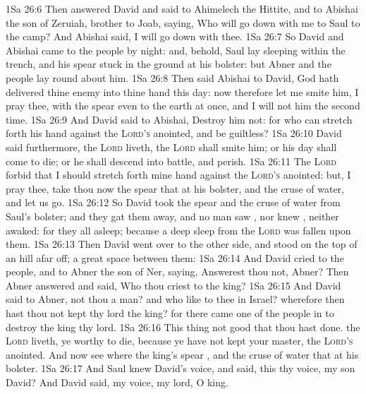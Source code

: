 \vs 1Sa 26:6 Then answered David and said to Ahimelech the Hittite, and to Abishai the son of Zeruiah, brother to Joab, saying, Who will go down with me to Saul to the camp? And Abishai said, I will go down with thee.
\vs 1Sa 26:7 So David and Abishai came to the people by night: and, behold, Saul lay sleeping within the trench, and his spear stuck in the ground at his bolster: but Abner and the people lay round about him.
\vs 1Sa 26:8 Then said Abishai to David, God hath delivered thine enemy into thine hand this day: now therefore let me smite him, I pray thee, with the spear even to the earth at once, and I will not  him the second time.
\vs 1Sa 26:9 And David said to Abishai, Destroy him not: for who can stretch forth his hand against the \textsc{Lord's} anointed, and be guiltless?
\vs 1Sa 26:10 David said furthermore,  the \textsc{Lord} liveth, the \textsc{Lord} shall smite him; or his day shall come to die; or he shall descend into battle, and perish.
\vs 1Sa 26:11 The \textsc{Lord} forbid that I should stretch forth mine hand against the \textsc{Lord's} anointed: but, I pray thee, take thou now the spear that  at his bolster, and the cruse of water, and let us go.
\vs 1Sa 26:12 So David took the spear and the cruse of water from Saul's bolster; and they gat them away, and no man saw , nor knew , neither awaked: for they  all asleep; because a deep sleep from the \textsc{Lord} was fallen upon them.
\vs 1Sa 26:13 Then David went over to the other side, and stood on the top of an hill afar off; a great space  between them:
\vs 1Sa 26:14 And David cried to the people, and to Abner the son of Ner, saying, Answerest thou not, Abner? Then Abner answered and said, Who  thou  criest to the king?
\vs 1Sa 26:15 And David said to Abner,  not thou a  man? and who  like to thee in Israel? wherefore then hast thou not kept thy lord the king? for there came one of the people in to destroy the king thy lord.
\vs 1Sa 26:16 This thing  not good that thou hast done.  the \textsc{Lord} liveth, ye  worthy to die, because ye have not kept your master, the \textsc{Lord's} anointed. And now see where the king's spear , and the cruse of water that  at his bolster.
\vs 1Sa 26:17 And Saul knew David's voice, and said,  this thy voice, my son David? And David said,  my voice, my lord, O king.
